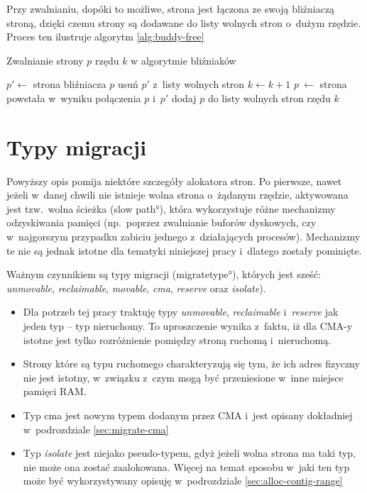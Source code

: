 Przy zwalnianiu, dopóki to możliwe, strona jest łączona ze swoją
bliźniaczą stroną, dzięki czemu strony są dodawane do listy wolnych
stron o~dużym rzędzie.  Proces ten ilustruje algorytm
\ref{alg:buddy-free}

\begin{algorithm}\label{alg:buddy-free}
\caption{Zwalnianie strony $p$ rzędu $k$ w algorytmie bliźniaków}
\begin{algorithmic}[1]
        \State $p' \gets$ strona bliźniacza $p$
        \State usuń $p'$ z~listy wolnych stron
        \State $k \gets k + 1$
        \State $p~\gets$ strona powstała w~wyniku połączenia $p$ i~$p'$ \label{alg:buddy-free:join}
    \EndWhile
    \State dodaj $p$ do listy wolnych stron rzędu $k$\label{alg:buddy-free:add}
\EndProcedure
\end{algorithmic}
\end{algorithm}


\section{Typy migracji}\label{sec:migratetype}

Powyższy opis pomija niektóre szczegóły alokatora stron.  Po pierwsze,
nawet jeżeli w~danej chwili nie istnieje wolna strona o~żądanym
rzędzie, aktywowana jest tzw.\ wolna ścieżka (\ang{slow path}), która
wykorzystuje różne mechanizmy odzyskiwania pamięci (np.\ poprzez
zwalnianie buforów dyskowych, czy w~najgorszym przypadku zabiciu
jednego z~działających procesów).  Mechanizmy te nie są jednak istotne
dla tematyki niniejszej pracy i~dlatego zostały pominięte.

Ważnym czynnikiem są typy migracji (\ang{migratetype}), których jest
sześć: {\it unmovable}, {\it reclaimable}, {\it movable}, {\it cma},
{\it reserve} oraz {\it isolate}).

\begin{itemize}
\item Dla potrzeb tej pracy traktuję typy {\it unmovable}, {\it
  reclaimable} i~{\it reserve} jak jeden typ -- typ nieruchomy.  To
  uproszczenie wynika z~faktu, iż dla CMA-y istotne jest tylko
  rozróżnienie pomiędzy stroną ruchomą i~nieruchomą.
\item Strony które są typu ruchomego charakteryzują się tym, że ich
  adres fizyczny nie jest istotny, w~związku z~czym mogą być
  przeniesione w~inne miejsce pamięci RAM.
\item Typ cma jest nowym typem dodanym przez CMA i~jest opisany
  dokładniej w~podrozdziale \ref{sec:migrate-cma}
\item Typ {\it isolate} jest niejako pseudo-typem, gdyż jeżeli wolna
  strona ma taki typ, nie może ona zostać zaalokowana.  Więcej na
  temat sposobu w~jaki ten typ może być wykorzystywany opisuję
  w~podrozdziale \ref{sec:alloc-contig-range}
\end{itemize}

